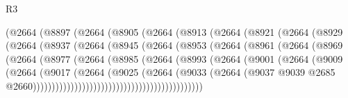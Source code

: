 \begin{lexlean}{R3}
\begin{coremodule}
                  (@2664
                    (@8897
                      (@2664
                        (@8905
                          (@2664
                            (@8913
                              (@2664
                                (@8921
                                  (@2664
                                    (@8929
                                      (@2664
                                        (@8937
                                          (@2664
                                            (@8945
                                              (@2664
                                                (@8953
                                                  (@2664
                                                    (@8961
                                                      (@2664
                                                        (@8969
                                                          (@2664
                                                            (@8977
                                                              (@2664
                                                                (@8985
                                                                  (@2664
                                                                    (@8993
                                                                      (@2664
                                                                        (@9001
                                                                          (@2664
                                                                            (@9009
                                                                              (@2664
                                                                                (@9017
                                                                                  (@2664
                                                                                    (@9025
                                                                                      (@2664
                                                                                        (@9033
                                                                                          (@2664
                                                                                            (@9037
                                                                                              @9039
                                                                                              @2685
                                                                                              @2660)))))))))))))))))))))))))))))))))))))))))))))

\end{coremodule}
\end{lexlean}
